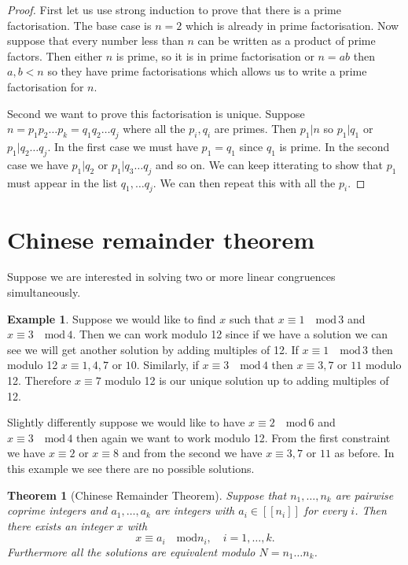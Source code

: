 \documentclass[
]{book}
\newtheorem{theorem}{Theorem}[chapter]
\theoremstyle{definition}
\theoremstyle{definition}
\newtheorem{example}{Example}[chapter]
\theoremstyle{definition}
\theoremstyle{definition}
\theoremstyle{remark}
\begin{document}
\begin{proof}
First let us use strong induction to prove that there is a prime factorisation. The base case is \(n=2\) which is already in prime factorisation. Now suppose that every number less than \(n\) can be written as a product of prime factors. Then either \(n\) is prime, so it is in prime factorisation or \(n=ab\) then \(a,b < n\) so they have prime factorisations which allows us to write a prime factorisation for \(n\).

Second we want to prove this factorisation is unique. Suppose \(n = p_1 p_2 \dots p_k = q_1 q_2 \dots q_j\) where all the \(p_i, q_i\) are primes. Then \(p_1 | n\) so \(p_1|q_1\) or \(p_1 |q_2\dots q_j\). In the first case we must have \(p_1=q_1\) since \(q_1\) is prime. In the second case we have \(p_1|q_2\) or \(p_1 |q_3 \dots q_j\) and so on. We can keep itterating to show that \(p_1\) must appear in the list \(q_1, \dots q_j\). We can then repeat this with all the \(p_i\).
\end{proof}

\section{Chinese remainder theorem}\label{chinese-remainder-theorem}

Suppose we are interested in solving two or more linear congruences simultaneously.

\begin{example}
Suppose we would like to find \(x\) such that \(x \equiv 1 \quad \mbox{mod} \, 3\) and \(x \equiv 3 \quad \mbox{mod} \, 4\). Then we can work modulo 12 since if we have a solution we can see we will get another solution by adding multiples of 12. If \(x \equiv 1 \quad \mbox{mod} \, 3\) then modulo 12 \(x \equiv 1, 4, 7\) or \(10\). Similarly, if \(x \equiv 3 \quad \mbox{mod}\, 4\) then \(x \equiv 3, 7\) or \(11\) modulo 12. Therefore \(x \equiv 7\) modulo 12 is our unique solution up to adding multiples of 12.

Slightly differently suppose we would like to have \(x \equiv 2 \quad \mbox{mod} \, 6\) and \(x \equiv 3 \quad \mbox{mod} \, 4\) then again we want to work modulo 12. From the first constraint we have \(x \equiv 2\) or \(x \equiv 8\) and from the second we have \(x \equiv 3, 7\) or \(11\) as before. In this example we see there are no possible solutions.
\end{example}

\begin{theorem}[Chinese Remainder Theorem]
Suppose that \(n_1, \dots, n_k\) are pairwise coprime integers and \(a_1, \dots, a_k\) are integers with \(a_i \in [[n_i]]\) for every \(i\). Then there exists an integer \(x\) with
\[ x \equiv a_i \quad \mbox{mod} n_i, \quad i = 1, \dots, k.  \] Furthermore all the solutions are equivalent modulo \(N=n_1 \dots n_k\).
\end{theorem}
\end{document}
